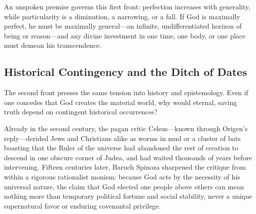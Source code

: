An unspoken premise governs this first front: perfection increases with generality, while particularity is a diminution, a narrowing, or a fall. If God is maximally perfect, he must be maximally general---an infinite, undifferentiated horizon of being or reason---and any divine investment in one time, one body, or one place must demean his transcendence.

\subsection{Historical Contingency and the Ditch of Dates}

The second front presses the same tension into history and epistemology. Even if one concedes that God creates the material world, why would eternal, saving truth depend on contingent historical occurrences?

Already in the second century, the pagan critic Celsus---known through Origen's reply---derided Jews and Christians alike as worms in mud or a cluster of bats boasting that the Ruler of the universe had abandoned the rest of creation to descend in one obscure corner of Judea, and had waited thousands of years before intervening. Fifteen centuries later, Baruch Spinoza sharpened the critique from within a rigorous rationalist monism: because God acts by the necessity of his universal nature, the claim that God elected one people above others can mean nothing more than temporary political fortune and social stability, never a unique supernatural favor or enduring covenantal privilege.

